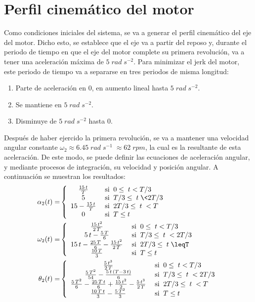 \documentclass[12pt]{article}
\begin{document}
\section{Perfil cinemático del motor}
Como condiciones iniciales del sistema, se va a generar el perfil cinemático del eje del motor. Dicho esto, se establece que el eje va a partir del reposo y, durante el periodo de tiempo en que el eje del motor complete su primera revolución, va a tener una aceleración máxima de $5\;rad\;s^{-2}$. Para minimizar el jerk del motor, este periodo de tiempo va a separarse en tres periodos de misma longitud:
\begin{enumerate}
    \item Parte de aceleración en $0$, en aumento lineal hasta $5\;rad\;s^{-2}$.
    \item Se mantiene en $5\;rad\;s^{-2}$.
    \item Disminuye de $5\;rad\;s^{-2}$ hasta $0$.
\end{enumerate}
Después de haber ejercido la primera revolución, se va a mantener una velocidad angular constante $\omega_2 \approx6.45\;rad\;s^{-1}\;\approx 62\;rpm$, la cual es la resultante de esta aceleración. De este modo, se puede definir las ecuaciones de aceleración angular, y mediante procesos de integración, su velocidad y posición angular. A continuación se muestran los resultados:
\scriptsize
\begin{align}
\alpha_2(t)=&\left\lbrace \begin{array}{cl}
\frac{15\,t}{T} & \;\textrm{si}\;\;0\leq\;t<T/3\\
5 & \;\textrm{si}\;\;T/3\leq\;t\;\<2T/3\\
15-\frac{15\,t}{T} & \;\textrm{si}\;\;2T/3\leq\;t\;<T\\
0 & \;\textrm{si}\;\;T\le t
\end{array}\right. \label{MotorAce}\\
\omega_2(t)=&\left\lbrace \begin{array}{cl}
\frac{15\,t^2 }{2\,T}  & \;\textrm{si}\;\;0\leq\;t<T/3\\
5\,t-\frac{5\,T}{6} & \;\textrm{si}\;\;T/3\leq\;t\;<2T/3\\
15\,t-\frac{25\,T}{6}-\frac{15\,t^2 }{2\,T}  & \;\textrm{si}\;\;2T/3\leq\;t\;\leqT\\
\frac{10\,T}{3} & \;\textrm{si}\;\;T\le t
\end{array}\right.\label{MotorVel}\\
\theta_2(t)=&\left\lbrace \begin{array}{cl}
\frac{5\,t^3 }{2\,T}  & \;\textrm{si}\;\;0\leq\;t<T/3\\
\frac{5\,T^2 }{54}-\frac{5\,t\,{\left(T-3\,t\right)}}{6} & \;\textrm{si}\;\;T/3\leq\;t\;< 2T/3\\
\frac{5\,T^2 }{6}-\frac{25\,T\,t}{6}+\frac{15\,t^2 }{2}-\frac{5\,t^3 }{2\,T}  & \;\textrm{si}\;\;2T/3\leq\;t\;<T\\
\frac{10\,T\,t}{3}-\frac{5\,T^2 }{3} & \;\textrm{si}\;\;T\le t
\end{array}\right.\label{motorPos}
\end{align}
\end{document}
